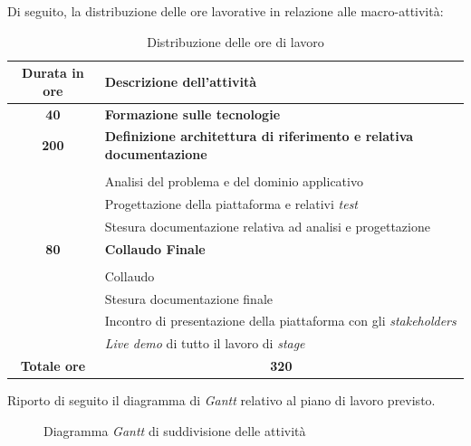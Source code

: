 Di seguito, la distribuzione delle ore lavorative in relazione alle macro-attività:
    \begin{table}[H]
        \begin{tabularx}{\textwidth}{|c|X|}
            \hline
            \textbf{Durata in ore} & \textbf{Descrizione dell'attività} \\ \hline
            
            \textbf{40} & \textbf{Formazione sulle tecnologie} \\	 
            \hline
            
            \textbf{200} & \textbf{Definizione architettura di riferimento e relativa documentazione} \\ \hdashline 
            \multirow{3}{0cm}\\ 
            & 
            {Analisi del problema e del dominio applicativo} \\
            & 
            {Progettazione della piattaforma e relativi \textit{test}} \\
            & 
            {Stesura documentazione relativa ad analisi e progettazione} \\
            \hline
            
            \textbf{80} & \textbf{Collaudo Finale}  \\ \hdashline 
            \multirow{4}{0cm}\\ 
            & 
            {Collaudo} \\
            & 
            {Stesura documentazione finale} \\
            & 
            {Incontro di presentazione della piattaforma con gli \textit{stakeholders}} \\
            & 
            {\textit{Live demo} di tutto il lavoro di \textit{stage}} \\
            \hline
            
            \textbf{Totale ore} & \multicolumn{1}{|c|}{\textbf{320}} \\ \hline
        \end{tabularx}
        \caption{Distribuzione delle ore di lavoro}
    \end{table}
    
    \vspace{0.5cm}
    Riporto di seguito il diagramma di \textit{Gantt} relativo al piano di lavoro previsto.
    \begin{figure}[H]
        \caption[Diagramma \textit{Gantt} di suddivisione delle attività]{Diagramma \textit{Gantt} di suddivisione delle attività}
    \end{figure}


